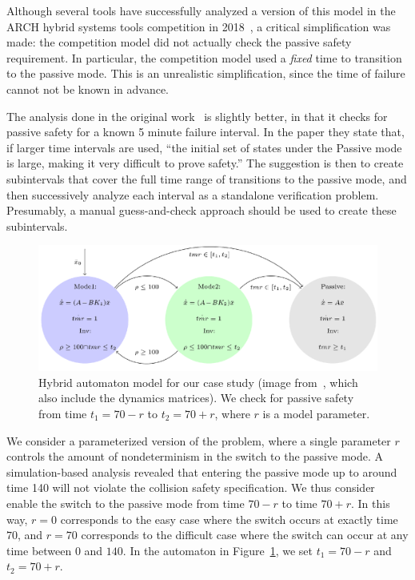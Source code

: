 Although several tools have successfully analyzed a version of this model in the ARCH hybrid systems tools competition in
2018~\cite{archcomp18linear}, a critical simplification was made: the competition model did not actually check the passive safety requirement.
%
In particular, the competition model used a \emph{fixed} time to transition to the passive mode.
%
This is an unrealistic simplification, since the time of failure cannot not be known in advance.


The analysis done in the original work~\cite{chan2017verifying} is slightly better, in that it checks for passive safety for a known 5 minute failure interval.
%
In the paper they state that, if larger time intervals are used,
``the initial set of states under the Passive mode is large, making it very difficult to prove safety.''
%
The suggestion is then to create subintervals that cover the full time range of transitions to the passive mode, and then successively
analyze each interval as a standalone verification problem.
%
Presumably, a manual guess-and-check approach should be used to create these subintervals.

\begin{figure}[t]
\centerline{\includegraphics[width=0.9\columnwidth]{images/ha.png}}
\caption{Hybrid automaton model for our case study (image from~\cite{chan2017verifying}, which also include the dynamics matrices). We check for passive safety
  from time $t_1=70 - r$ to $t_2=70 + r$, where $r$ is a model parameter.}
\label{fig:ha}
\end{figure}

We consider a parameterized version of the problem, where a single parameter $r$ controls the amount of nondeterminism in the switch to the passive mode.
%
A simulation-based analysis revealed that entering the passive mode up to around time 140 will not violate the collision safety specification.
%
We thus consider enable the switch to the passive mode from time $70-r$ to time $70+r$.
%
In this way, $r=0$ corresponds to the easy case where the switch
occurs at exactly time $70$, and $r=70$ corresponds to the difficult case where the switch can occur at any time between $0$ and $140$.
%
In the automaton in Figure~\ref{fig:ha}, we set $t_1=70 - r$ and $t_2=70 + r$.

